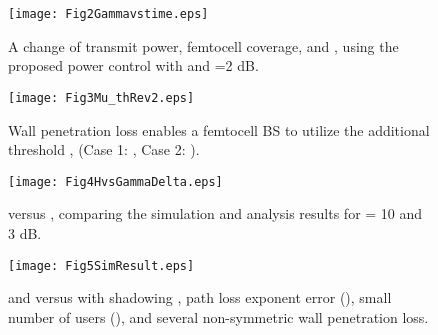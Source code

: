 \documentclass[draftclsnofoot,12pt,onecolumn]{IEEEtran}
\begin{document}
\begin{figure}
\begin{center}
\texttt{[image: Fig2Gammavstime.eps]}
    \caption{A change of transmit power, femtocell coverage, and , using the proposed power control with  and =2 dB.}
    \label{fig:Gamma}
\end{center}
\end{figure}



\begin{figure}
\begin{center}
   \texttt{[image: Fig3Mu\_thRev2.eps]}
    \caption{Wall penetration loss  enables a femtocell BS to utilize the additional threshold
    ,  (Case 1: , Case 2: ).}
    \label{fig:Margin}
\end{center}
\end{figure}



\begin{figure}[h]
\begin{center}
\texttt{[image: Fig4HvsGammaDelta.eps]}
    \caption{ versus , comparing the simulation and analysis results for  = 10 and 3 dB.}
    \label{fig:Result1}
\end{center}
\end{figure}

\begin{figure}[h]
\begin{center}
   \texttt{[image: Fig5SimResult.eps]}
    \caption{ and  versus  with shadowing , path loss exponent error (), small number of users (), and several non-symmetric wall penetration loss.}
    \label{fig:Result2}
\end{center}
\end{figure}
\end{document}
